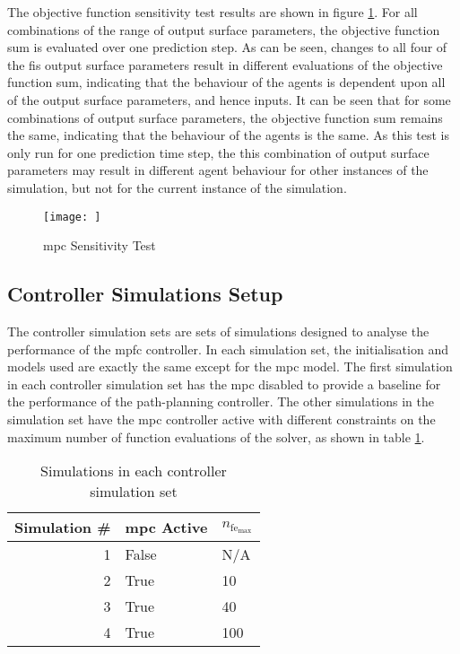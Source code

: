 \documentclass[conference]{IEEEtran}
\begin{document}
The objective function sensitivity test results are shown in figure \ref{fig:plot_mpc_sens_test}.
For all combinations of the range of output surface parameters, the objective function sum is evaluated over one prediction step.
As can be seen, changes to all four of the \gls{fis} output surface parameters result in different evaluations of the objective function sum, indicating that the behaviour of the agents is dependent upon all of the output surface parameters, and hence inputs.
It can be seen that for some combinations of output surface parameters, the objective function sum remains the same, indicating that the behaviour of the agents is the same.
As this test is only run for one prediction time step, the this combination of output surface parameters may result in different agent behaviour for other instances of the simulation, but not for the current instance of the simulation.

\begin{figure}
    \centering
    \texttt{[image: ]}
    \caption{\gls{mpc} Sensitivity Test}
    \label{fig:plot_mpc_sens_test}
\end{figure}

\subsection{Controller Simulations Setup}

The controller simulation sets are sets of simulations designed to analyse the performance of the \gls{mpfc} controller.
In each simulation set, the initialisation and models used are exactly the same except for the \gls{mpc} model.
The first simulation in each controller simulation set has the \gls{mpc} disabled to provide a baseline for the performance of the path-planning controller.
The other simulations in the simulation set have the \gls{mpc} controller active with different constraints on the maximum number of function evaluations of the solver, as shown in table \ref{tab:CSS_simulations}.

\begin{table}[]
    \centering
    \caption{Simulations in each controller simulation set}
    \label{tab:CSS_simulations}
    \begin{tabular}{r|ll}
    \toprule
        Simulation # & \gls{mpc} Active & $n_{\text{fe}_{\text{max}}}$ \\
        \midrule
        1 & False & N/A \\
        2 & True & 10\\
        3 & True & 40\\
        4 & True & 100\\
        \bottomrule
    \end{tabular}
\end{table}
\end{document}

